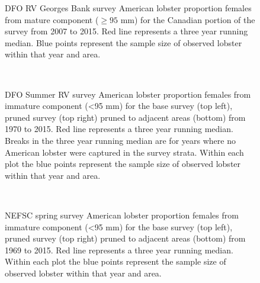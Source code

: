 \documentclass[11pt]{article}
\newcommand{\e}{/backup/bio_data/bio.lobster/figures/} %
\begin{document}
\begin{figure}

    \caption{DFO RV Georges Bank survey American lobster proportion females from mature component ($ \ge 95$ mm) for the Canadian portion of the survey from 2007 to 2015. Red line represents a three year running median. Blue points represent the sample size of observed lobster within that year and area.}

\end{figure}


\begin{figure}
\centering
{}\\
\caption{DFO Summer RV survey American lobster proportion females from immature component (\textless 95 mm) for the base survey (top left), pruned survey (top right) pruned to adjacent areas (bottom) from 1970 to 2015. Red line represents a three year running median. Breaks in the three year running median are for years where no American lobster were captured in the survey strata. Within each plot the blue points represent the sample size of observed lobster within that year and area.}
\end{figure}
\clearpage


\begin{figure}
\centering
{}\\
\caption{NEFSC spring survey American lobster proportion females from immature component (\textless 95 mm) for the base survey (top left), pruned survey (top right) pruned to adjacent areas (bottom) from 1969 to 2015. Red line represents a three year running median. Within each plot the blue points represent the sample size of observed lobster within that year and area. }
\end{figure}
\clearpage
\end{document}
